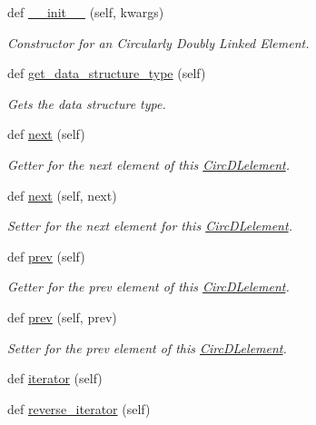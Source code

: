 \begin{DoxyCompactItemize}
\item 
def \hyperlink{classbridges_1_1circ__dl__element_1_1_circ_d_lelement_a9536764f84d69deb9f7e03d6802a71b6}{\+\_\+\+\_\+init\+\_\+\+\_\+} (self, kwargs)
\begin{DoxyCompactList}\small\item\em Constructor for an Circularly Doubly Linked Element. \end{DoxyCompactList}\item 
def \hyperlink{classbridges_1_1circ__dl__element_1_1_circ_d_lelement_ac33a5699a662730bb6f292654e6896dc}{get\+\_\+data\+\_\+structure\+\_\+type} (self)
\begin{DoxyCompactList}\small\item\em Gets the data structure type. \end{DoxyCompactList}\item 
def \hyperlink{classbridges_1_1circ__dl__element_1_1_circ_d_lelement_a09b8b12344743709cce1d5fd926b88e9}{next} (self)
\begin{DoxyCompactList}\small\item\em Getter for the next element of this \hyperlink{classbridges_1_1circ__dl__element_1_1_circ_d_lelement}{Circ\+D\+Lelement}. \end{DoxyCompactList}\item 
def \hyperlink{classbridges_1_1circ__dl__element_1_1_circ_d_lelement_a842efa9c0ad878fe34b343600a23d9aa}{next} (self, next)
\begin{DoxyCompactList}\small\item\em Setter for the next element for this \hyperlink{classbridges_1_1circ__dl__element_1_1_circ_d_lelement}{Circ\+D\+Lelement}. \end{DoxyCompactList}\item 
def \hyperlink{classbridges_1_1circ__dl__element_1_1_circ_d_lelement_aa2ebe17f407680a6a4fc886ef9516d61}{prev} (self)
\begin{DoxyCompactList}\small\item\em Getter for the prev element of this \hyperlink{classbridges_1_1circ__dl__element_1_1_circ_d_lelement}{Circ\+D\+Lelement}. \end{DoxyCompactList}\item 
def \hyperlink{classbridges_1_1circ__dl__element_1_1_circ_d_lelement_a5b62548af44a610a2230258fe641d8a2}{prev} (self, prev)
\begin{DoxyCompactList}\small\item\em Setter for the prev element of this \hyperlink{classbridges_1_1circ__dl__element_1_1_circ_d_lelement}{Circ\+D\+Lelement}. \end{DoxyCompactList}\item 
def \hyperlink{classbridges_1_1circ__dl__element_1_1_circ_d_lelement_a3a796e463ea4ed382770bbe8107fd2d8}{iterator} (self)
\item 
def \hyperlink{classbridges_1_1circ__dl__element_1_1_circ_d_lelement_ae92b2635ac5d448f4ad90d058fb5e4ab}{reverse\+\_\+iterator} (self)
\end{DoxyCompactItemize}
